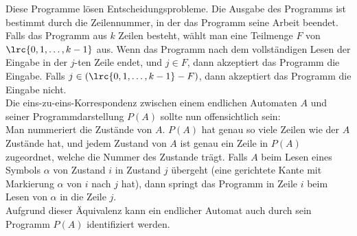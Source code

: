 Diese Programme lösen Entscheidungsprobleme. Die Ausgabe des Programms ist bestimmt durch die Zeilennummer, in der das Programm seine Arbeit beendet. Falls das Programm aus $k$ Zeilen besteht, wählt man eine Teilmenge $F$ von $\lrc{0,1,\ldots ,k-1}$ aus. Wenn das Programm nach dem vollständigen Lesen der Eingabe in der $j$-ten Zeile endet, und $j\in F$, dann akzeptiert das Programm die Eingabe. Falls $j\in (\lrc{0,1,\ldots ,k-1} - F)$, dann akzeptiert das Programm die Eingabe nicht.\\
Die eins-zu-eins-Korrespondenz zwischen einem endlichen Automaten $A$ und seiner Programmdarstellung $P(A)$ sollte nun offensichtlich sein:\\
Man nummeriert die Zustände von $A$. $P(A)$ hat genau so viele Zeilen wie der $A$ Zustände hat, und jedem Zustand von $A$ ist genau ein Zeile in $P(A)$ zugeordnet, welche die Nummer des Zustande trägt. Falls $A$ beim Lesen eines Symbols $\alpha$ von Zustand $i$ in Zustand $j$ übergeht (eine gerichtete Kante mit Markierung $\alpha$ von $i$ nach $j$ hat), dann springt das Programm in Zeile $i$ beim Lesen von $\alpha$ in die Zeile $j$.\\
Aufgrund dieser Äquivalenz kann ein endlicher Automat auch durch sein Programm $P(A)$ identifiziert werden.\\

